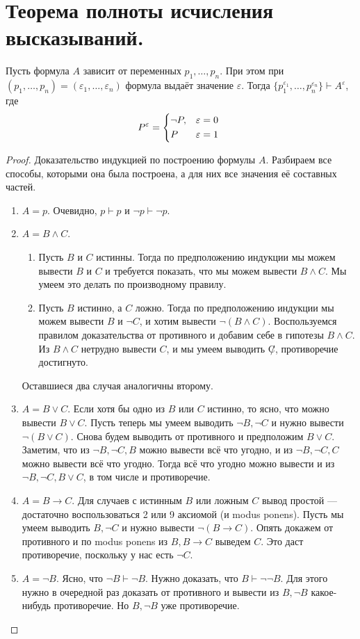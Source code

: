 \documentclass{article}
\begin{document}
\section{Теорема полноты исчисления высказываний.}
\begin{lemma}
	Пусть формула $A$ зависит от переменных $p_1, \ldots, p_n$. При этом при $(p_1, \ldots, p_n) = (\varepsilon_1, \ldots, \varepsilon_n)$ формула выдаёт значение $\varepsilon$. Тогда $\{p_1^{\varepsilon_1}, \ldots, p_n^{\varepsilon_n}\} \vdash A^{\varepsilon}$, где
\[P^\varepsilon = \begin{dcases*} \lnot P, & $\varepsilon = 0$ \\ P& $\varepsilon = 1$ \end{dcases*} \]
\end{lemma}

\begin{proof}
	Доказательство индукцией по построению формулы $A$. Разбираем все способы, которыми она была построена, а для них все значения её составных частей.
	\begin{enumerate}
		\item $A = p$. Очевидно, $p \vdash p$ и $\lnot p \vdash \lnot p$.
		\item $A = B \land C$.
		\begin{enumerate}
			\item Пусть $B$ и $C$ истинны. Тогда по предположению индукции мы можем вывести $B$ и $C$ и требуется показать, что мы можем вывести $B \land C$. Мы умеем это делать по производному правилу.
			\item Пусть $B$ истинно, а $C$ ложно. Тогда по предположению индукции мы можем вывести $B$ и $\lnot C$, и хотим вывести $\lnot(B \land C)$. Воспользуемся правилом доказательства от противного и добавим себе в гипотезы $B \land C$. Из $B \land C$ нетрудно вывести $C$, и мы умеем выводить $\not C$, противоречие достигнуто.
		\end{enumerate}
		Оставшиеся два случая аналогичны второму.
		\item $A = B \lor C$. Если хотя бы одно из $B$ или $C$ истинно, то ясно, что можно вывести $B \lor C$. Пусть теперь мы умеем выводить $\lnot B, \lnot C$ и нужно вывести $\lnot (B \lor C)$. Снова будем выводить от противного и предположим $B \lor C$. Заметим, что из $\lnot B, \lnot C, B$ можно вывести всё что угодно, и из $\lnot B, \lnot C, C$ можно вывести всё что угодно. Тогда всё что угодно можно вывести и из $\lnot B, \lnot C, B \lor C$, в том числе и противоречие.
		\item $A = B \to C$. Для случаев с истинным $B$ или ложным $C$ вывод простой --- достаточно воспользоваться 2 или 9 аксиомой (и modus ponens). Пусть мы умеем выводить $B, \lnot C$ и нужно вывести $\lnot(B \to C)$. Опять докажем от противного и по modus ponens из $B, B \to C$ выведем $C$. Это даст противоречие, поскольку у нас есть $\lnot C$.
		\item $A = \lnot B$. Ясно, что $\lnot B \vdash \lnot B$. Нужно доказать, что $B \vdash \lnot \lnot B$. Для этого нужно в очередной раз доказать от противного и вывести из $B, \lnot B$ какое-нибудь противоречие. Но $B, \lnot B$ уже противоречие.
	\end{enumerate}
\end{proof}
\end{document}
